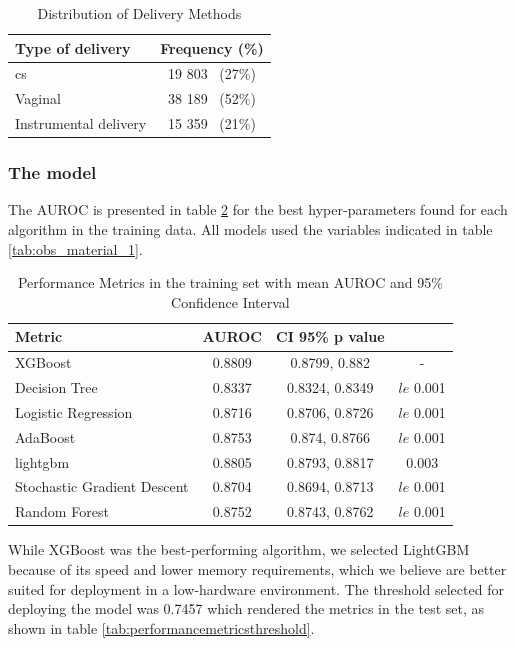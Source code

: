 \begin{table}[htbp]
  \centering
  \caption{Distribution of Delivery Methods}
  \label{tab:delivery_methods}
  \renewcommand{\arraystretch}{1.5} %
  \setlength{\tabcolsep}{12pt} %
  \begin{tabular}{lc}
    \hline
    \textbf{Type of delivery} & \textbf{Frequency (\%)} \\
\hline
    \ac{cs} & 19 803 \, (27\%) \\

    Vaginal & 38 189 \, (52\%) \\

    Instrumental delivery & 15 359 \, (21\%) \\
    \hline
  \end{tabular}
\end{table}



\subsubsection{The model}
The AUROC is presented in table \ref{tab:performancemetricsauc} for the best hyper-parameters found for each algorithm in the training data. All models used the variables indicated in table \ref{tab:obs_material_1}.
\begin{table}[htbp]
  \centering
  \caption[Performance Metrics in the training set]{Performance Metrics in the training set with mean AUROC and 95\% Confidence Interval}
  \label{tab:performancemetricsauc}
  \renewcommand{\arraystretch}{1.5} %
  \setlength{\tabcolsep}{12pt} %
  \begin{tabular}{lccc}
    \hline
    \textbf{Metric} & \textbf{AUROC} & \textbf{CI 95\%} \textbf{p value} \\
    \hline
    XGBoost & 0.8809 & 0.8799, 0.882 & - \\  
    Decision Tree & 0.8337 & 0.8324, 0.8349 & $le$ 0.001\\
    Logistic Regression & 0.8716 & 0.8706, 0.8726 & $le$ 0.001\\
    AdaBoost & 0.8753 & 0.874, 0.8766 & $le$ 0.001\\ 
    lightgbm & 0.8805 & 0.8793, 0.8817 &  0.003\\ 
    Stochastic Gradient Descent & 0.8704 & 0.8694, 0.8713& $le$ 0.001\\ 
    Random Forest & 0.8752 & 0.8743, 0.8762& $le$ 0.001 \\  
    \hline
  \end{tabular}
\end{table}
While XGBoost was the best-performing algorithm, we selected LightGBM  \cite{lightgbm} because of its speed and lower memory requirements, which we believe are better suited for deployment in a low-hardware environment. The threshold selected for deploying the model was 0.7457 which rendered the metrics in the test set, as shown in table \ref{tab:performancemetricsthreshold}.

